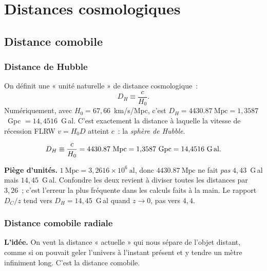 \documentclass[11pt,a4paper,openany]{report}
\newcommand{\Mpc}{\text{Mpc}}
\newcommand{\Gly}{\text{G\,al}}
\newcommand{\al}{\text{al}}
\newcommand{\Hzero}{H_{0}}
\begin{document}
\part{Distances cosmologiques}

\chapter{Distance comobile}
\label{chap:Dc}

\section{Distance de Hubble}

\begin{tcolorbox}[mathspe]
On définit une « unité naturelle » de distance cosmologique~:
\[
D_{H} \equiv \frac{c}{\Hzero}.
\]
Numériquement, avec $\Hzero = 67{,}66$~km/s/Mpc, c'est
$D_{H} = \num{4430.87}~\Mpc = 1{,}3587$~Gpc $= 14{,}4516$~G\,al.
C'est exactement la distance à laquelle la vitesse de récession FLRW
$v = \Hzero D$ atteint $c$~: la \emph{sphère de Hubble}.
\end{tcolorbox}

\begin{equation}
D_{H} \equiv \frac{c}{\Hzero} = \num{4430.87}~\Mpc = 1{,}3587~\text{Gpc}
     = 14{,}4516~\Gly .
\label{eq:DH}
\end{equation}

\begin{tcolorbox}[attention]
\textbf{Piège d'unités.} $1~\Mpc = 3{,}2616\times 10^{6}~\al$, donc
$\num{4430.87}~\Mpc$ ne fait \emph{pas} $4{,}43$~G\,al mais $14{,}45$~G\,al.
Confondre les deux revient à diviser toutes les distances par $3{,}26$~; c'est
l'erreur la plus fréquente dans les calculs faits à la main. Le rapport
$D_{C}/z$ tend vers $D_{H} = 14{,}45$~G\,al quand $z\to 0$, pas vers $4{,}4$.
\end{tcolorbox}

\section{Distance comobile radiale}

\begin{tcolorbox}[vulgarisation]
\textbf{L'idée.} On veut la distance « actuelle » qui nous sépare de l'objet
distant, comme si on pouvait geler l'univers à l'instant présent et y tendre
un mètre infiniment long. C'est la distance comobile.
\end{tcolorbox}
\end{document}
